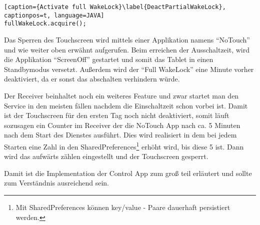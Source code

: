 \begin{flushleft}
\begin{lstlisting}[caption={Activate full WakeLock}\label{DeactPartialWakeLock}, captionpos=t, language=JAVA]
fullWakeLock.acquire();
\end{lstlisting}

Das Sperren des Touchscreen wird mittels einer Applikation namens ``NoTouch'' und wie weiter oben erwähnt aufgerufen.
Beim erreichen der Ausschaltzeit, wird die Applikation ``ScreenOff'' gestartet und somit das Tablet in einen Standbymodus versetzt. Außerdem wird der ``Full WakeLock'' eine Minute vorher deaktiviert, da er sonst das abschalten verhindern würde.

Der Receiver beinhaltet noch ein weiteres Feature und zwar startet man den Service in den meisten fällen nachdem die Einschaltzeit schon vorbei ist. Damit ist der Touchscreen für den ersten Tag noch nicht deaktiviert, somit läuft sozusagen ein Counter im Receiver der die NoTouch App nach ca. 5 Minuten nach dem Start des Dienstes ausführt. Dies wird realisiert in dem bei jedem Starten eine Zahl in den SharedPreferences\footnote{Mit SharedPreferences können key/value - Paare dauerhaft persistiert werden.} erhöht wird, bis diese 5 ist. Dann wird das aufwärts zählen eingestellt und der Touchscreen gesperrt.

Damit ist die Implementation der Control App zum groß teil erläutert und sollte zum Verständnis ausreichend sein.

\end{flushleft}